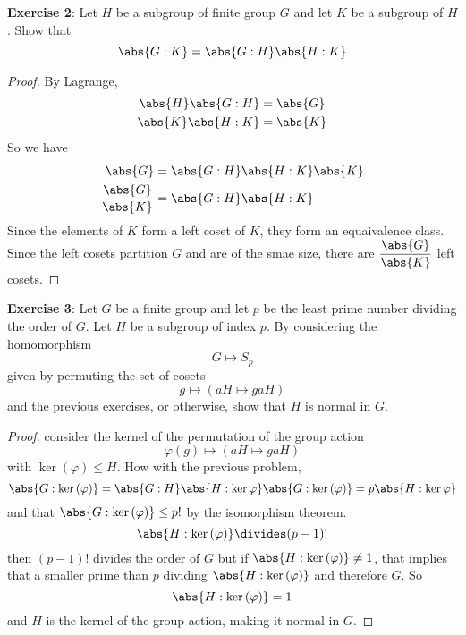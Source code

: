 \documentclass{article}
\begin{document}
\textbf{Exercise 2}: Let $H$ be a subgroup of finite group $G$ and let $K$ be a subgroup of $H$. Show that 
\begin{equation*}
	\abs{G:K} = \abs{G:H}\abs{H:K}
\end{equation*}
\begin{proof}
	By Lagrange,
	\begin{align*}
		\abs{H}\abs{G : H} &= \abs{G} \\
		\abs{K}\abs{H : K} &= \abs{K}
	\end{align*}
	So we have
	\begin{align*}
		\abs{G} &= \abs{G : H}\abs{H : K}\abs{K} \\
		\dfrac{\abs{G}}{\abs{K}} &= \abs{G : H}\abs{H : K}
	\end{align*}
	Since the elements of $K$ form a left coset of $K$, they form an equaivalence class. Since the left cosets partition $G$ and are of the smae size, there are $\dfrac{\abs{G}}{\abs{K}}$ left cosets.
\end{proof}

\textbf{Exercise 3}: Let $G$ be a finite group and let $p$ be the least prime number dividing the order of $G$. Let $H$ be a subgroup of index $p$. By considering the homomorphism
\begin{equation*}
	G \mapsto S_{p}
\end{equation*}
given by permuting the set of cosets
\begin{equation*}
	g \mapsto (aH \mapsto gaH)
\end{equation*}
and the previous exercises, or otherwise, show that $H$ is normal in $G$.

\begin{proof}
	consider the kernel of the permutation of the group action
	\begin{equation*}
		\varphi(g) \mapsto (aH \mapsto gaH)
	\end{equation*}
	with $\ker{(\varphi)} \leq H$. How with the previous problem,
	\begin{equation*}
		\abs{G : \ker{(\varphi)}} = \abs{G : H}\abs{H : \ker{\varphi}} \\
		\abs{G : \ker{(\varphi)}} = p\abs{H : \ker{\varphi}}
	\end{equation*}
	and that $\abs{G : \ker{(\varphi)}} \leq p!$ by the isomorphism theorem. 
	\begin{equation*}
		\abs{H : \ker{(\varphi)}} \divides (p - 1)!
	\end{equation*}
	then $(p - 1)!$ divides the order of $G$ but if $\abs{H : \ker{(\varphi)}} \neq 1$, that implies that a smaller prime than $p$ dividing $\abs{H : \ker{(\varphi)}}$ and therefore $G$. So 
	\begin{equation*}
		\abs{H : \ker{(\varphi)}} = 1
	\end{equation*}
	and $H$ is the kernel of the group action, making it normal in $G$.
\end{proof} 
\end{document}
